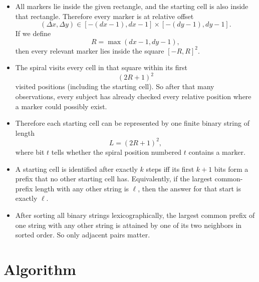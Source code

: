 \documentclass[11pt]{article}
\begin{document}
\begin{itemize}[leftmargin=*]
    \item All markers lie inside the given rectangle, and the starting cell is also inside that rectangle.
    Therefore every marker is at relative offset
    \[
        (\Delta x, \Delta y) \in [-(dx-1), dx-1] \times [-(dy-1), dy-1].
    \]
    If we define
    \[
        R = \max(dx-1, dy-1),
    \]
    then every relevant marker lies inside the square $[-R, R]^2$.

    \item The spiral visits every cell in that square within its first
    \[
        (2R+1)^2
    \]
    visited positions (including the starting cell). So after that many observations, every subject has
    already checked every relative position where a marker could possibly exist.

    \item Therefore each starting cell can be represented by one finite binary string of length
    \[
        L = (2R+1)^2,
    \]
    where bit $t$ tells whether the spiral position numbered $t$ contains a marker.

    \item A starting cell is identified after exactly $k$ steps iff its first $k+1$ bits form a prefix that no
    other starting cell has. Equivalently, if the largest common-prefix length with any other string is
    $\ell$, then the answer for that start is exactly $\ell$.

    \item After sorting all binary strings lexicographically, the largest common prefix of one string with
    any other string is attained by one of its two neighbors in sorted order. So only adjacent pairs matter.
\end{itemize}

\section*{Algorithm}
\end{document}

